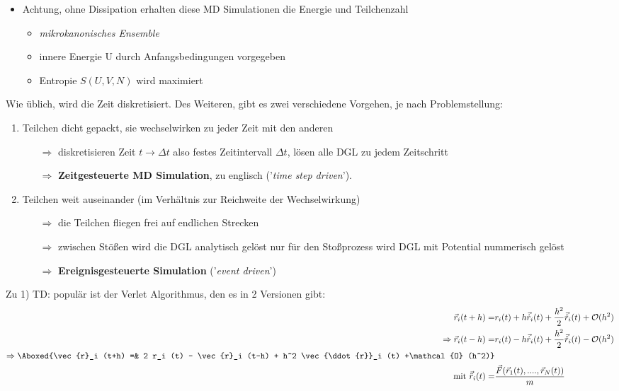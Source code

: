 \documentclass[12pt]{article}
\begin{document}
 \begin{itemize}
 \item Achtung, ohne Dissipation erhalten diese MD Simulationen die Energie und Teilchenzahl 
\begin{itemize}
\item \textit{mikrokanonisches Ensemble}
\item  innere Energie U durch Anfangsbedingungen vorgegeben
\item Entropie $S(U,V,N)$ wird maximiert
\end{itemize} 
\end{itemize}
Wie üblich, wird die Zeit diskretisiert. Des Weiteren, gibt es zwei verschiedene Vorgehen, je nach Problemstellung:
 \begin{enumerate}
 \item Teilchen dicht gepackt, sie wechselwirken zu jeder Zeit mit den anderen \\
 \begin{itemize}
 \item[$\Rightarrow$] diskretisieren Zeit $t \to \Delta t$ also festes Zeitintervall $\Delta t$, lösen alle DGL zu jedem Zeitschritt 
 \item[$\Rightarrow$] \textbf{Zeitgesteuerte MD Simulation}, zu englisch ('\textit{time step driven}').
 \end{itemize}
 
 \item Teilchen weit auseinander (im Verhältnis zur Reichweite der Wechselwirkung) 
 \begin{itemize}
 \item[$\Rightarrow$] die Teilchen fliegen frei auf endlichen Strecken
 \item[$\Rightarrow$] zwischen Stößen wird die DGL analytisch gelöst nur für den Stoßprozess wird DGL mit Potential nummerisch gelöst
 \item[$\Rightarrow$]  \textbf{Ereignisgesteuerte Simulation} ('\textit{event driven}')
 \end{itemize}  
 \end{enumerate}
 
 
Zu 1) TD: populär ist der Verlet Algorithmus, den es in 2 Versionen gibt:
\begin{align}
\vec{r}_i (t+h) =& r_i(t) + h \vec{\dot{r}}_i(t) + \frac{h^2}{2} \vec{\ddot{r}}_i(t) + \mathcal{O} (h^2) \\
\Rightarrow \vec{r}_i (t-h) =& r_i (t) - h \vec{\dot{r}}_i (t) + \frac{h^2}{2} \vec{\ddot{r}}_i (t) - \mathcal{O} (h^2) \\
\Rightarrow 
 \Aboxed{\vec{r}_i (t+h) =& 2 r_i (t) - \vec{r}_i (t-h) + h^2 \vec{\ddot{r}}_i (t) +\mathcal{O} (h^2)} \\
 \mbox{mit } \vec{\ddot{r}}_i (t)=& \frac{\vec{F}(\vec{r}_1 (t),...., \vec{r}_N(t))}{m} 
\end{align} 
 
\end{document}
